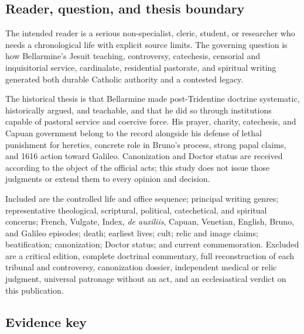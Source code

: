 \subsection{Reader, question, and thesis boundary}

The intended reader is a serious non-specialist, cleric, student, or researcher
who needs a chronological life with explicit source limits.  The governing
question is how Bellarmine's Jesuit teaching, controversy, catechesis,
censorial and inquisitorial service, cardinalate, residential pastorate, and
spiritual writing generated both durable Catholic authority and a contested
legacy.

The historical thesis is that Bellarmine made post-Tridentine doctrine
systematic, historically argued, and teachable, and that he did so through
institutions capable of pastoral service and coercive force.  His prayer,
charity, catechesis, and Capuan government belong to the record alongside his
defense of lethal punishment for heretics, concrete role in Bruno's process,
strong papal claims, and 1616 action toward Galileo.  Canonization and Doctor
status are received according to the object of the official acts; this study
does not issue those judgments or extend them to every opinion and decision.

Included are the controlled life and office sequence; principal writing
genres; representative theological, scriptural, political, catechetical, and
spiritual concerns; French, Vulgate, Index, \emph{de auxiliis}, Capuan,
Venetian, English, Bruno, and Galileo episodes; death; earliest lives; cult;
relic and image claims; beatification; canonization; Doctor status; and current
commemoration.  Excluded are a critical edition, complete doctrinal commentary,
full reconstruction of each tribunal and controversy, canonization dossier,
independent medical or relic judgment, universal patronage without an act, and
an ecclesiastical verdict on this publication.

\subsection{Evidence key}

